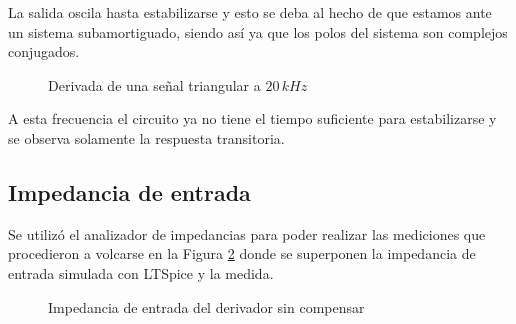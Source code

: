 La salida oscila hasta estabilizarse y esto se deba al hecho de que estamos ante un sistema subamortiguado, siendo así ya que los polos del sistema son complejos conjugados.

\begin{figure}[H]
	\begin{center}
		\caption{Derivada de una señal triangular a $20 \, kHz$}
		\label{fig:derivtriangNOcomp20kHz}
	\end{center}
\end{figure}

A esta frecuencia el circuito ya no tiene el tiempo suficiente para estabilizarse y se observa solamente la respuesta transitoria.

\subsection{Impedancia de entrada}
Se utilizó el analizador de impedancias para poder realizar las mediciones que procedieron a volcarse en la Figura \ref{fig:zinsuperDERivador} donde se superponen la impedancia de entrada simulada con LTSpice y la medida.


\begin{figure}[H]
	\begin{center}
		\caption{Impedancia de entrada del derivador sin compensar}
		\label{fig:zinsuperDERivador}
	\end{center}
\end{figure}

